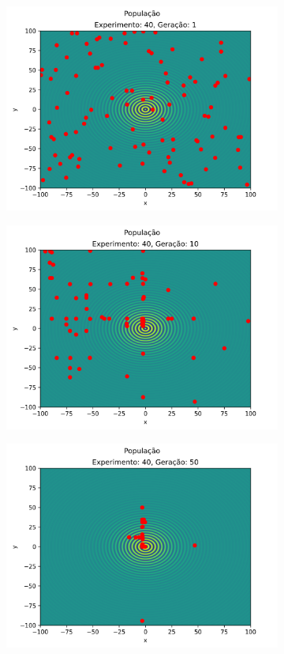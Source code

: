 \documentclass[12pt]{article}
\begin{document}
	\begin{figure}[htb]
	\begin{subfigure}{.5\textwidth}
		\centering
		\includegraphics[width=0.9\linewidth]{./imgs/results/0_population_gen_1_exp_40.png}
	  \end{subfigure}
	  \begin{subfigure}{.5\textwidth}
		\centering
		\includegraphics[width=0.9\linewidth]{./imgs/results/0_population_gen_10_exp_40.png}
	  \end{subfigure}
	  \begin{subfigure}{.5\textwidth}
		\centering
		\includegraphics[width=0.9\linewidth]{./imgs/results/0_population_gen_50_exp_40.png}

\end{subfigure}
\end{figure}
\end{document}
